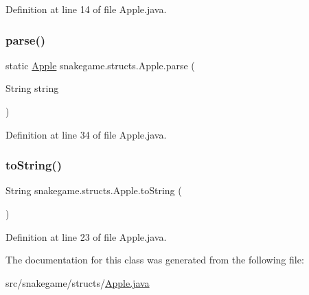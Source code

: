 Definition at line 14 of file Apple.\+java.

\mbox{\label{classsnakegame_1_1structs_1_1_apple_aa7282ddcff4a6529e95e679a2a57ec5b}} 
\subsubsection{\texorpdfstring{parse()}{parse()}}
{\footnotesize\ttfamily static \mbox{\hyperlink{classsnakegame_1_1structs_1_1_apple}{Apple}} snakegame.\+structs.\+Apple.\+parse (\begin{DoxyParamCaption}\item[{String}]{string }\end{DoxyParamCaption})\hspace{0.3cm}{\ttfamily [static]}}



Definition at line 34 of file Apple.\+java.

\mbox{\label{classsnakegame_1_1structs_1_1_apple_abebdf6e508f4ce621f460cd95d498028}} 
\subsubsection{\texorpdfstring{to\+String()}{toString()}}
{\footnotesize\ttfamily String snakegame.\+structs.\+Apple.\+to\+String (\begin{DoxyParamCaption}{ }\end{DoxyParamCaption})}



Definition at line 23 of file Apple.\+java.



The documentation for this class was generated from the following file\+:\begin{DoxyCompactItemize}
\item 
src/snakegame/structs/\mbox{\hyperlink{structs_2apple_8java}{Apple.\+java}}\end{DoxyCompactItemize}
